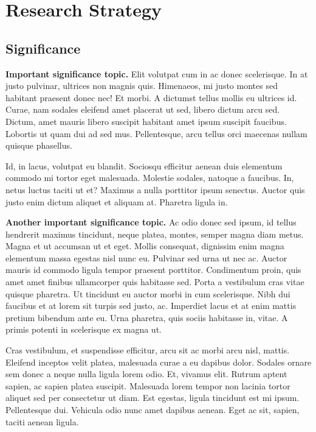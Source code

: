 \documentclass[11pt,]{article}
\title{}
\author{}
\date{}
\begin{document}
\hypertarget{research-strategy}{%
\section{Research Strategy}\label{research-strategy}}

\hypertarget{significance}{%
\subsection{Significance}\label{significance}}

\textbf{Important significance topic.} Elit volutpat cum in ac donec
scelerisque. In at justo pulvinar, ultrices non magnis quis. Himenaeos,
mi justo montes sed habitant praesent donec nec! Et morbi. A dictumst
tellus mollis eu ultrices id. Curae, nam sodales eleifend amet placerat
ut sed, libero dictum arcu sed. Dictum, amet mauris libero suscipit
habitant amet ipsum suscipit faucibus. Lobortis ut quam dui ad sed mus.
Pellentesque, arcu tellus orci maecenas nullam quisque phasellus.

Id, in lacus, volutpat eu blandit. Sociosqu efficitur aenean duis
elementum commodo mi tortor eget malesuada. Molestie sodales, natoque a
faucibus. In, netus luctus taciti ut et? Maximus a nulla porttitor ipsum
senectus. Auctor quis justo enim dictum aliquet et aliquam at. Pharetra
ligula in.

\textbf{Another important significance topic.} Ac odio donec sed ipsum,
id tellus hendrerit maximus tincidunt, neque platea, montes, semper
magna diam metus. Magna et ut accumsan ut et eget. Mollis consequat,
dignissim enim magna elementum massa egestas nisl nunc eu. Pulvinar sed
urna ut nec ac. Auctor mauris id commodo ligula tempor praesent
porttitor. Condimentum proin, quis amet amet finibus ullamcorper quis
habitasse sed. Porta a vestibulum cras vitae quisque pharetra. Ut
tincidunt eu auctor morbi in cum scelerisque. Nibh dui faucibus et at
lorem sit turpis sed justo, ac. Imperdiet lacus et at enim mattis
pretium bibendum ante eu. Urna pharetra, quis sociis habitasse in,
vitae. A primis potenti in scelerisque ex magna ut.

Cras vestibulum, et suspendisse efficitur, arcu sit ac morbi arcu nisl,
mattis. Eleifend inceptos velit platea, malesuada curae a eu dapibus
dolor. Sodales ornare sem donec a neque nulla ligula lorem odio. Et,
vivamus elit. Rutrum aptent sapien, ac sapien platea suscipit. Malesuada
lorem tempor non lacinia tortor aliquet sed per consectetur ut diam. Est
egestas, ligula tincidunt est mi ipsum. Pellentesque dui. Vehicula odio
nunc amet dapibus aenean. Eget ac sit, sapien, taciti aenean ligula.
\end{document}
